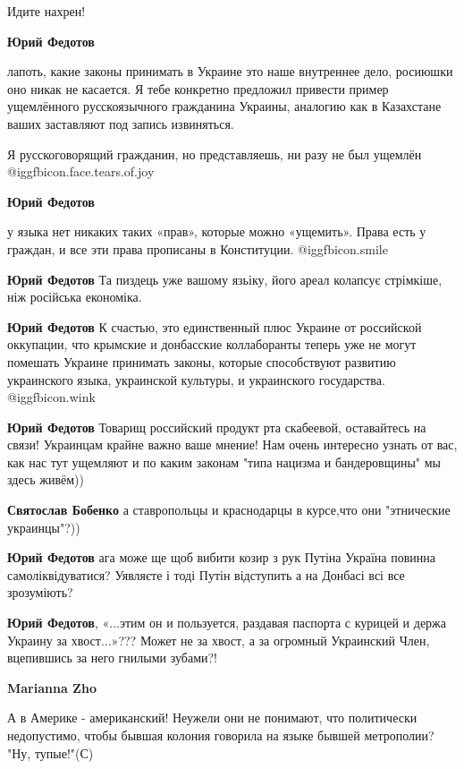 \begin{itemize}
\begin{itemize}
Идите нахрен!

\textbf{Юрий Федотов} 

лапоть, какие законы принимать в Украине это наше внутреннее дело, росиюшки оно
никак не касается. Я тебе конкретно предложил привести пример ущемлённого
русскоязычного гражданина Украины, аналогию как в Казахстане ваших заставляют
под запись извиняться.

Я русскоговорящий гражданин, но представляешь, ни разу не был ущемлён @igg{fbicon.face.tears.of.joy} 


\textbf{Юрий Федотов} 

у языка нет никаких таких «прав», которые можно «ущемить». Права есть у
граждан, и все эти права прописаны в Конституции.  @igg{fbicon.smile} 

\textbf{Юрий Федотов} Та пиздець уже вашому язьіку, його ареал колапсує стрімкіше, ніж російська економіка.

\textbf{Юрий Федотов} К счастью, это единственный плюс Украине от российской оккупации, что крымские и донбасские коллаборанты теперь уже не могут помешать Украине принимать законы, которые способствуют развитию украинского языка, украинской культуры, и украинского государства.  @igg{fbicon.wink} 

\textbf{Юрий Федотов} Товарищ российский продукт рта скабеевой, оставайтесь на связи! Украинцам крайне важно ваше мнение! Нам очень интересно узнать от вас, как нас тут ущемляют и по каким законам "типа нацизма и бандеровщины" мы здесь живём))

\textbf{Святослав Бобенко} а ставропольцы и краснодарцы в курсе,что они "этнические украинцы"?))

\textbf{Юрий Федотов} ага може ще щоб вибити козир з рук Путіна Україна повинна самоліквідуватися? Уявляєте і тоді Путін відступить а на Донбасі всі все зрозуміють?

\textbf{Юрий Федотов},
«...этим он и пользуется, раздавая паспорта с курицей и держа Украину за хвост...»???
Может не за хвост, а за огромный Украинский Член,
вцепившись за него гнилыми зубами?!

\textbf{Marianna Zho} 

А в Америке - американский! Неужели они не понимают, что политически
недопустимо, чтобы бывшая колония говорила на языке бывшей метрополии? "Ну,
тупые!"(С)


\end{itemize}
\end{itemize}
